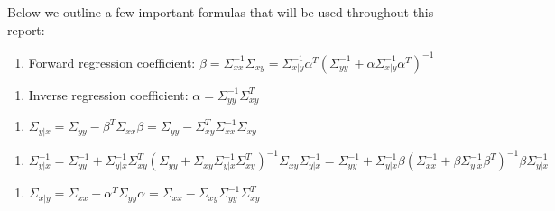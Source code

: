 \documentclass[11pt,]{book}
\providecommand{\tightlist}{%
  \setlength{\itemsep}{0pt}\setlength{\parskip}{0pt}}
\theoremstyle{definition}
\theoremstyle{definition}
\theoremstyle{definition}
\theoremstyle{remark}
\begin{document}
Below we outline a few important formulas that will be used throughout
this report:

\vspace{0.5cm}

\begin{enumerate}
\def\labelenumi{\arabic{enumi}.}
\tightlist
\item
  Forward regression coefficient:
  \(\beta = \Sigma_{xx}^{-1}\Sigma_{xy} = \Sigma_{x | y}^{-1}\alpha^{T}\left( \Sigma_{yy}^{-1} + \alpha\Sigma_{x | y}^{-1}\alpha^{T} \right)^{-1}\)
\end{enumerate}

\vspace{0.5cm}

\begin{enumerate}
\def\labelenumi{\arabic{enumi}.}
\setcounter{enumi}{1}
\tightlist
\item
  Inverse regression coefficient:
  \(\alpha = \Sigma_{yy}^{-1}\Sigma_{xy}^{T}\)
\end{enumerate}

\vspace{0.5cm}

\begin{enumerate}
\def\labelenumi{\arabic{enumi}.}
\setcounter{enumi}{2}
\tightlist
\item
  \(\Sigma_{y | x} = \Sigma_{yy} - \beta^{T}\Sigma_{xx}\beta = \Sigma_{yy} - \Sigma_{xy}^{T}\Sigma_{xx}^{-1}\Sigma_{xy}\)
\end{enumerate}

\vspace{0.5cm}

\begin{enumerate}
\def\labelenumi{\arabic{enumi}.}
\setcounter{enumi}{3}
\tightlist
\item
  \(\Sigma_{y | x}^{-1} = \Sigma_{yy}^{-1} + \Sigma_{y | x}^{-1}\Sigma_{xy}^{T}\left( \Sigma_{yy} + \Sigma_{xy}\Sigma_{y | x}^{-1}\Sigma_{xy}^{T} \right)^{-1}\Sigma_{xy}\Sigma_{y | x}^{-1} = \Sigma_{yy}^{-1} + \Sigma_{y | x}^{-1}\beta\left( \Sigma_{xx}^{-1} + \beta\Sigma_{y | x}^{-1}\beta^{T} \right)^{-1}\beta\Sigma_{y | x}^{-1}\)
\end{enumerate}

\vspace{0.5cm}

\begin{enumerate}
\def\labelenumi{\arabic{enumi}.}
\setcounter{enumi}{4}
\tightlist
\item
  \(\Sigma_{x | y} = \Sigma_{xx} - \alpha^{T}\Sigma_{yy}\alpha = \Sigma_{xx} - \Sigma_{xy}\Sigma_{yy}^{-1}\Sigma_{xy}^{T}\)
\end{enumerate}
\end{document}
